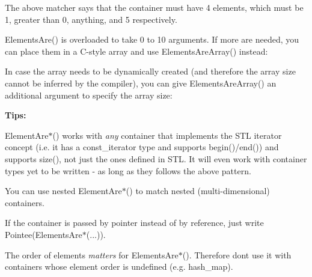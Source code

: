 The above matcher says that the container must have 4 elements, which must be 1, greater than 0, anything, and 5 respectively.

{\ttfamily Elements\+Are()} is overloaded to take 0 to 10 arguments. If more are needed, you can place them in a C-\/style array and use {\ttfamily Elements\+Are\+Array()} instead\+:


\begin{DoxyCode}{0}
\DoxyCodeLine{}
\DoxyCodeLine{}
\end{DoxyCode}


In case the array needs to be dynamically created (and therefore the array size cannot be inferred by the compiler), you can give {\ttfamily Elements\+Are\+Array()} an additional argument to specify the array size\+:


\begin{DoxyCode}{0}
\end{DoxyCode}


{\bfseries{Tips\+:}}


\begin{DoxyItemize}
\item {\ttfamily Element\+Are$\ast$()} works with {\itshape any} container that implements the S\+TL iterator concept (i.\+e. it has a {\ttfamily const\+\_\+iterator} type and supports {\ttfamily begin()/end()}) and supports {\ttfamily size()}, not just the ones defined in S\+TL. It will even work with container types yet to be written -\/ as long as they follows the above pattern.
\item You can use nested {\ttfamily Element\+Are$\ast$()} to match nested (multi-\/dimensional) containers.
\item If the container is passed by pointer instead of by reference, just write {\ttfamily Pointee(\+Elements\+Are$\ast$(...))}.
\item The order of elements {\itshape matters} for {\ttfamily Elements\+Are$\ast$()}. Therefore don\textquotesingle{}t use it with containers whose element order is undefined (e.\+g. {\ttfamily hash\+\_\+map}).
\end{DoxyItemize}


